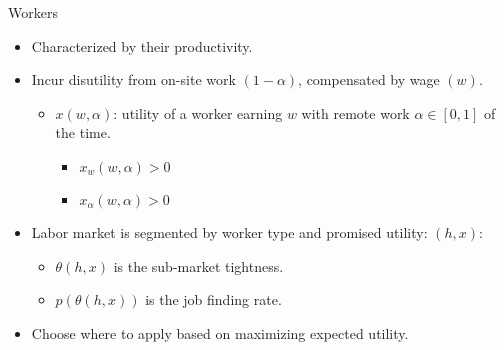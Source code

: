\documentclass[aspectratio=1610]{beamer}
\begin{document}
\begin{frame}{Workers}
  \begin{itemize}
    \item Characterized by their productivity. \vspace{0.3cm}%
    \item Incur disutility from on-site work $(1-\alpha)$, compensated by wage $(w)$.
    \begin{itemize}
        \item $x(w,\alpha)$: utility of a worker earning $w$ with remote work $\alpha\in[0,1]$ of the time.
        \begin{itemize}
            \item $x_{w}(w,\alpha)>0$
            \item $x_{\alpha}(w,\alpha)>0$
        \end{itemize}
    \end{itemize}\vspace{0.3cm}%
    \item Labor market is segmented by worker type and promised utility: $(h,x)$:
    \begin{itemize}
        \item $\theta(h,x)$ is the sub-market tightness.
        \item $p(\theta(h,x))$ is the job finding rate.
    \end{itemize}\vspace{0.3cm}%
    \item Choose where to apply based on maximizing expected utility.
  \end{itemize}
\end{frame}
\end{document}
